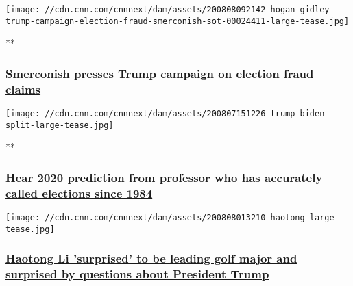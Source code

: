 \href{/videos/politics/2020/08/08/hogan-gidley-trump-campaign-election-fraud-smerconish-sot.cnn}{}

\texttt{[image: //cdn.cnn.com/cnnnext/dam/assets/200808092142-hogan-gidley-trump-campaign-election-fraud-smerconish-sot-00024411-large-tease.jpg]}

**

\hypertarget{smerconish-presses-trump-campaign-on-election-fraud-claims-}{%
\subsubsection{\texorpdfstring{\href{/videos/politics/2020/08/08/hogan-gidley-trump-campaign-election-fraud-smerconish-sot.cnn}{Smerconish
presses Trump campaign on election fraud claims
}}{Smerconish presses Trump campaign on election fraud claims }}\label{smerconish-presses-trump-campaign-on-election-fraud-claims-}}

\href{/videos/politics/2020/08/08/allan-lichtman-2020-predicts-trump-loses-to-biden-smerconish-sot.cnn}{}

\texttt{[image: //cdn.cnn.com/cnnnext/dam/assets/200807151226-trump-biden-split-large-tease.jpg]}

**

\hypertarget{hear-2020-prediction-from-professor-who-has-accurately-called-elections-since-1984}{%
\subsubsection{\texorpdfstring{\href{/videos/politics/2020/08/08/allan-lichtman-2020-predicts-trump-loses-to-biden-smerconish-sot.cnn}{Hear
2020 prediction from professor who has accurately called elections since
1984}}{Hear 2020 prediction from professor who has accurately called elections since 1984}}\label{hear-2020-prediction-from-professor-who-has-accurately-called-elections-since-1984}}

\href{/2020/08/08/golf/golf-pga-haotong-trump-koepka-woods-spt-intl/index.html}{}

\texttt{[image: //cdn.cnn.com/cnnnext/dam/assets/200808013210-haotong-large-tease.jpg]}

\hypertarget{haotong-li-surprised-to-be-leading-golf-major-and-surprised-by-questions-about-president-trump}{%
\subsubsection{\texorpdfstring{\href{/2020/08/08/golf/golf-pga-haotong-trump-koepka-woods-spt-intl/index.html}{Haotong
Li 'surprised' to be leading golf major and surprised by questions about
President
Trump}}{Haotong Li 'surprised' to be leading golf major and surprised by questions about President Trump}}\label{haotong-li-surprised-to-be-leading-golf-major-and-surprised-by-questions-about-president-trump}}

